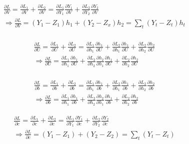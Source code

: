 \begin{example}
\begin{align*}
\frac{\partial L}{\partial V}=\frac{\partial L_1}{\partial V}+\frac{\partial L_2}{\partial V}=\frac{\partial L_1}{\partial Y_1}\frac{\partial Y_1}{\partial V}+\frac{\partial L_2}{\partial Y_2}\frac{\partial Y_2}{\partial V} \\
\Rightarrow \frac{\partial L}{\partial V}=(Y_1-Z_1)h_1+(Y_2-Z_x)h_2=\sum_{t}(Y_t-Z_t)h_t\\
\end{align*}

\begin{align*}
\frac{\partial L}{\partial U}=\frac{\partial L_1}{\partial U}+\frac{\partial L_2}{\partial U}=\frac{\partial L_1}{\partial h_1}\frac{\partial h_1}{\partial U}+\frac{\partial L_2}{\partial h_1}\frac{\partial h_1}{\partial U}+\frac{\partial L_2}{\partial h_2}\frac{\partial h_2}{\partial U}\\
\Rightarrow \frac{\partial L}{\partial U}=\frac{\partial L_1}{\partial h_1}\frac{\partial h_1}{\partial U}+\frac{\partial L_2}{\partial h_2}\frac{\partial h_2}{\partial h_1}\frac{\partial h_1}{\partial U}+\frac{\partial L_2}{\partial h_2}\frac{\partial h_2}{\partial U}\\
\end{align*}

\begin{align*}
\frac{\partial L}{\partial b}=\frac{\partial L_1}{\partial b}+\frac{\partial L_2}{\partial b}=\frac{\partial L_1}{\partial h_1}\frac{\partial h_1}{\partial b}+\frac{\partial L_2}{\partial h_1}\frac{\partial h_1}{\partial b}+\frac{\partial L_2}{\partial h_2}\frac{\partial h_2}{\partial b}\\
\Rightarrow \frac{\partial L}{\partial b}= \frac{\partial L_1}{\partial h_1}\frac{\partial h_1}{\partial b}+\frac{\partial L_2}{\partial h_2}\frac{\partial h_2}{\partial h_1}\frac{\partial h_1}{\partial b}+\frac{\partial L_2}{\partial h_2}\frac{\partial h_2}{\partial b}
\end{align*}

\begin{align*}
\frac{\partial L}{\partial c}=\frac{\partial L_1}{\partial c}+\frac{\partial L_2}{\partial c}=\frac{\partial L_1}{\partial Y_1}\frac{\partial Y_1}{\partial c}+\frac{\partial L_2}{\partial Y_2}\frac{\partial Y_2}{\partial c}\\
\Rightarrow \frac{\partial L}{\partial c}=(Y_1-Z_1)+(Y_2-Z_2)=\sum_{t}(Y_t-Z_t)
\end{align*}




\end{example}
